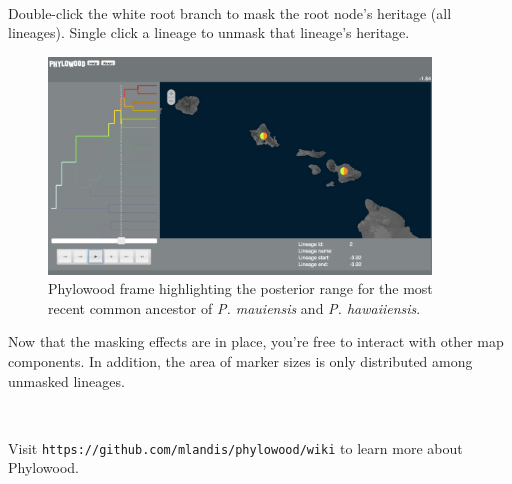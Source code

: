 \documentclass[11pt]{article}
\newcommand{\impmark}{\strut\vadjust{\domark}}
\newcommand{\domark}{%
  \vbox to 0pt{
    \kern-\dp\strutbox
    \smash{\llap{$\rightarrow$\kern1em}}
    \vss
  }%
}
\begin{document}
\noindent \\ \impmark Double-click the white root branch to mask the root node's heritage (all lineages). Single click a lineage to unmask that lineage's heritage. \\

\begin{figure}[H]
\centering
\includegraphics[width=4in]{figures/phw_br23}
\caption{Phylowood frame highlighting the posterior range for the most recent common ancestor of {\it P. mauiensis} and {\it P. hawaiiensis}.}
\end{figure}

Now that the masking effects are in place, you're free to interact with other map components.
In addition, the area of marker sizes is only distributed among unmasked lineages.

\noindent \\ \impmark Visit \texttt{https://github.com/mlandis/phylowood/wiki} to learn more about Phylowood.


\end{document}
